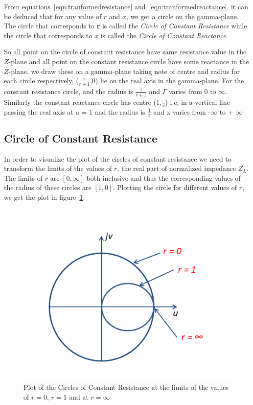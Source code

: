 From equations~\eqref{eqn:tranformedresistance} and~\eqref{eqn:tranformedreactance}, it can be deduced that for any value of $r$ and $x$, we get a circle on the gamma-plane. The circle that corresponds to \textbf{r} is called the \emph{Circle of Constant Resistance} while the circle that corresponds to $x$ is called the \emph{Circle of Constant Reactance}.

So all point on the circle of constant resistance have same resistance value in the $\bar{Z}$-plane and all point on the constant resistance circle have some reactance in the $\bar{Z}$-plane. we draw these on a gamma-plane taking note of centre and radius for each circle respectively, ($\frac{r}{r + 1}$,0) lie on the real axis in the gamma-plane. For the constant resistance circle, and the radius is $\frac{1}{r + 1}$ and $\Gamma$ varies from 0 to $\infty$. Similarly the constant reactance circle has centre (1,$\frac{}{x}$) i.e, in a vertical line passing the real axis at u = 1 and the radius is $\frac{1}{x}$ and x varies from -$\infty$ to + $\infty$

\subsection{Circle of Constant Resistance}
In order to visualize the plot of the circles of constant resistance we need to transform the limits of the values of $r$, the real part of normalized impedance $\bar{Z_L}$. The limits of $r$ are $[0, \infty]$ both inclusive and thus the corresponding values of the radius of these circles are $[1, 0]$. Plotting the circle for different values of $r$, we get the plot in figure~\ref{fig:ouytre}.
\begin{figure}[h]
\centering
\includegraphics[width=1\linewidth]{graphics/fig2.35}
\caption{Plot of the Circles of Constant Resistance at the limits of the values of $r = 0$, $r = 1$ and at $r = \infty$}
\label{fig:ouytre}
\end{figure}


